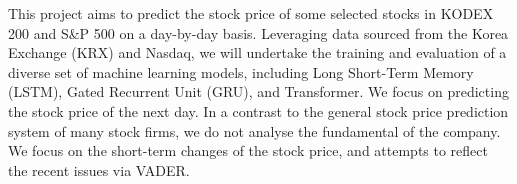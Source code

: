 This project aims to predict the stock price of some selected stocks in KODEX 200 and S\&P 500 on a day-by-day basis.
Leveraging data sourced from the Korea Exchange (KRX) and Nasdaq, we will undertake the training and evaluation of a diverse set of machine learning models, including Long Short-Term Memory (LSTM), Gated Recurrent Unit (GRU), and Transformer. 
We focus on predicting the stock price of the next day. 
In a contrast to the general stock price prediction system of many stock firms, we do not analyse the fundamental of the company. 
We focus on the short-term changes of the stock price, and attempts to reflect the recent issues via VADER.



